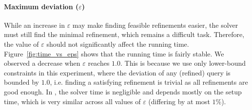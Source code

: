 \paragraph{Maximum deviation ($\varepsilon$)}
\label{sec:time_vs_eps}
While an increase in $\varepsilon$ may make finding feasible refinements easier, the solver must still find the minimal refinement, which remains a difficult task. Therefore, the value of $\varepsilon$ should not significantly affect the running time. Figure~\ref{fig:time_vs_eps} shows that the running time is fairly stable. We observed a decrease when $\varepsilon$ reaches $1.0$. This is because we use only lower-bound constraints in this experiment, where the deviation of any (refined) query is bounded by $1.0$, i.e. finding a satisfying refinement is trivial as all refinements are good enough.
In , 
the solver time is negligible and depends mostly on the setup time, which is very similar across all values of $\varepsilon$ (differing by at most $1\%$).



